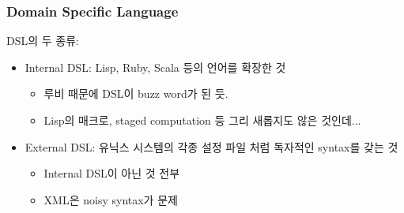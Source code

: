 \begin{frame}
\frametitle{Domain Specific Language}

DSL의 두 종류:
\begin{itemize}
\item Internal DSL: Lisp, Ruby, Scala  등의 언어를 확장한 것
    \begin{itemize}
    \item 루비 때문에 DSL이 buzz word가 된 듯.
    \item Lisp의 매크로, staged computation 등 그리 새롭지도 않은 것인데...
    \end{itemize}
\item External DSL: 유닉스 시스템의 각종 설정 파일 처럼 독자적인  syntax를 갖는 것
    \begin{itemize}
    \item Internal DSL이 아닌 것 전부
    \item XML은 noisy syntax가 문제
    \end{itemize}
\end{itemize}

\end{frame}
